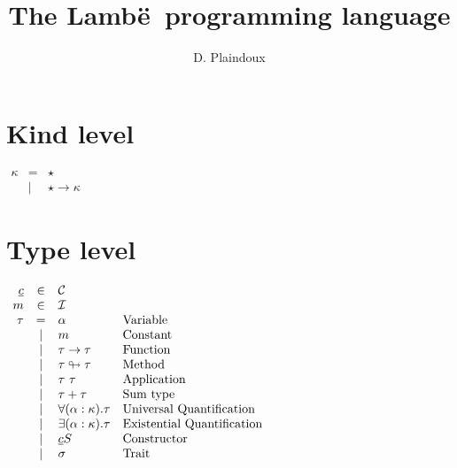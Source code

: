 \documentclass{article}[11pt]
\newcommand{\lambe}[0]{{\sf Lamb\"e~}}
\begin{document}
    \title{The \lambe programming language}
    \author{D. Plaindoux}

    \maketitle


    \section{Kind level}\label{sec:kind-level}

    \begin{math}
        \begin{array}{rcll}
            \kappa
            & =    & \star                    \\
            & \mid & \star \rightarrow \kappa
        \end{array}
    \end{math}


    \section{Type level}\label{sec:type-level}

    \begin{math}
        \begin{array}{rclp{5cm}}
            \underline{c} & \in & {\cal C} \\
            m & \in & {\cal I} \\
            \tau & =
            & \alpha & Variable \\
            & \mid & m                            & Constant                   \\
            & \mid & \tau \rightarrow \tau        & Function                   \\
            & \mid & \tau \looparrowright \tau    & Method                     \\
            & \mid & \tau~\tau                    & Application                \\
            & \mid & \tau + \tau                  & Sum~type                   \\
            & \mid & \forall (\alpha:\kappa).\tau & Universal~Quantification   \\
            & \mid & \exists (\alpha:\kappa).\tau & Existential~Quantification \\
            & \mid & \underline{c} S              & Constructor                \\
            & \mid & \sigma                       & Trait                      \\
        \end{array}
    \end{math}
\end{document}
